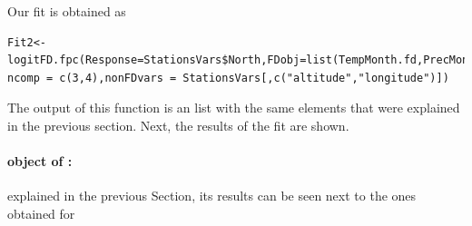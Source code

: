 Our fit is obtained as

\begin{verbatim}
Fit2<-logitFD.fpc(Response=StationsVars$North,FDobj=list(TempMonth.fd,PrecMonth.fd),
ncomp = c(3,4),nonFDvars = StationsVars[,c("altitude","longitude")])
\end{verbatim}

The output of this function is an  list with the same elements that were explained in the previous section. Next, the results of the fit are shown.

\paragraph{ object of :} explained in the previous Section, its results can be seen next to the ones obtained for  

